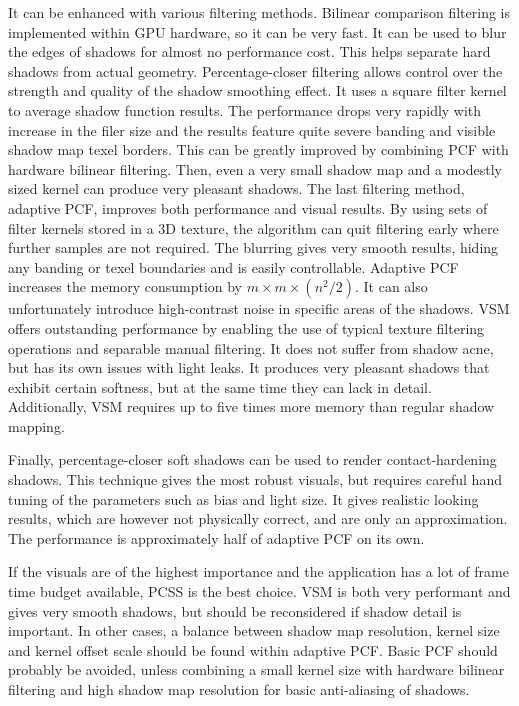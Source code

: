 It can be enhanced with various filtering methods. Bilinear comparison filtering is implemented within GPU hardware, so it can be very fast. It can be used to blur the edges of shadows for almost no performance cost. This helps separate hard shadows from actual geometry. Percentage-closer filtering allows control over the strength and quality of the shadow smoothing effect. It uses a square filter kernel to average shadow function results. The performance drops very rapidly with increase in the filer size and the results feature quite severe banding and visible shadow map texel borders. This can be greatly improved by combining PCF with hardware bilinear filtering. Then, even a very small shadow map and a modestly sized kernel can produce very pleasant shadows. The last filtering method, adaptive PCF, improves both performance and visual results. By using sets of filter kernels stored in a 3D texture, the algorithm can quit filtering early where further samples are not required. The blurring gives very smooth results, hiding any banding or texel boundaries and is easily controllable. Adaptive PCF increases the memory consumption by \(m\times m\times (n^2 / 2)\). It can also unfortunately introduce high-contrast noise in specific areas of the shadows. VSM offers outstanding performance by enabling the use of typical texture filtering operations and separable manual filtering. It does not suffer from shadow acne, but has its own issues with light leaks. It produces very pleasant shadows that exhibit certain softness, but at the same time they can lack in detail. Additionally, VSM requires up to five times more memory than regular shadow mapping.

Finally, percentage-closer soft shadows can be used to render contact-hardening shadows. This technique gives the most robust visuals, but requires careful hand tuning of the parameters such as bias and light size. It gives realistic looking results, which are however not physically correct, and are only an approximation. The performance is approximately half of adaptive PCF on its own.

If the visuals are of the highest importance and the application has a lot of frame time budget available, PCSS is the best choice. VSM is both very performant and gives very smooth shadows, but should be reconsidered if shadow detail is important. In other cases, a balance between shadow map resolution, kernel size and kernel offset scale should be found within adaptive PCF. Basic PCF should probably be avoided, unless combining a small kernel size with hardware bilinear filtering and high shadow map resolution for basic anti-aliasing of shadows.

